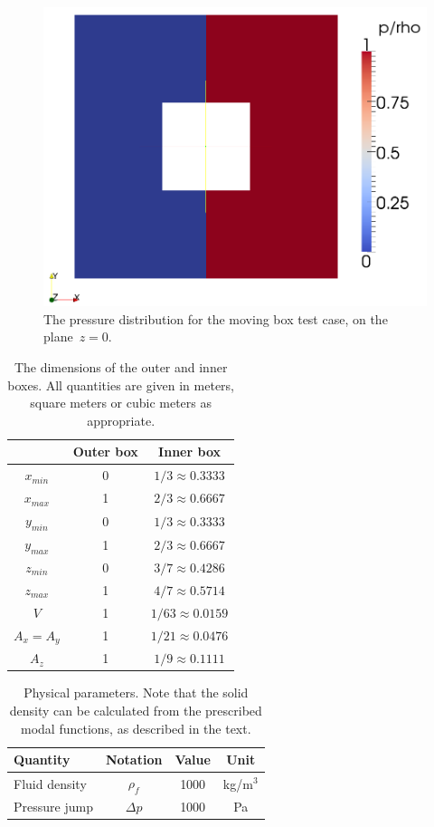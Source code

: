 \begin{figure}
\centering
\caption{The pressure distribution for the moving box test case, on the plane~$z=0$.}
\label{fig:boxP}
\includegraphics[width=0.7\linewidth]{figures/ml/fig1}
\end{figure}


\begin{table}[htp!]
\centering
\caption{The dimensions of the outer and inner boxes. All quantities
are given in meters, square meters or cubic meters as appropriate.}
\label{tab:boxParam}
\begin{tabular}{c|cc|}
&  Outer box & Inner box  \\ \hline
$x_{min}$ & 0  & $1/3\approx 0.3333$  \\
$x_{max}$ & 1  & $2/3\approx 0.6667$  \\
$y_{min}$ & 0  & $1/3\approx 0.3333$  \\
$y_{max}$ & 1  & $2/3\approx 0.6667$  \\
$z_{min}$ & 0  & $3/7\approx 0.4286$  \\
$z_{max}$ & 1  & $4/7\approx 0.5714$  \\ \hline 
$V$  & 1 & $1/63\approx 0.0159$ \\
$A_x=A_y$ & 1 & $1/21\approx 0.0476$ \\
$A_z$ & 1 & $1/9\approx 0.1111$ \\  \hline
\end{tabular}
\end{table}

\begin{table}[htp!]
\centering
\caption{Physical parameters. Note that the solid density can be calculated
from the prescribed modal functions, as described in the text.}
\label{tab:boxPar}
\begin{tabular}{l|ccc|}
Quantity & Notation & Value & Unit \\ \hline
Fluid density & $\rho_f$ & 1000 & kg/m$^3$ \\
Pressure jump & $\Delta p$ & 1000 & Pa \\ \hline
\end{tabular}
\end{table}


